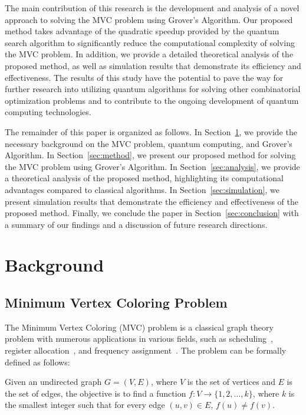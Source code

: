 The main contribution of this research is the development and analysis of a novel approach to solving the MVC problem using Grover's Algorithm. Our proposed method takes advantage of the quadratic speedup provided by the quantum search algorithm to significantly reduce the computational complexity of solving the MVC problem. In addition, we provide a detailed theoretical analysis of the proposed method, as well as simulation results that demonstrate its efficiency and effectiveness. The results of this study have the potential to pave the way for further research into utilizing quantum algorithms for solving other combinatorial optimization problems and to contribute to the ongoing development of quantum computing technologies.

The remainder of this paper is organized as follows. In Section~\ref{sec:background}, we provide the necessary background on the MVC problem, quantum computing, and Grover's Algorithm. In Section~\ref{sec:method}, we present our proposed method for solving the MVC problem using Grover's Algorithm. In Section~\ref{sec:analysis}, we provide a theoretical analysis of the proposed method, highlighting its computational advantages compared to classical algorithms. In Section~\ref{sec:simulation}, we present simulation results that demonstrate the efficiency and effectiveness of the proposed method. Finally, we conclude the paper in Section~\ref{sec:conclusion} with a summary of our findings and a discussion of future research directions.

\section{Background}
\label{sec:background}

\subsection{Minimum Vertex Coloring Problem}

The Minimum Vertex Coloring (MVC) problem is a classical graph theory problem with numerous applications in various fields, such as scheduling~\cite{malafiejski1982scheduling}, register allocation~\cite{chaitin1982register}, and frequency assignment~\cite{hale1980frequency}. The problem can be formally defined as follows:

\begin{definition}
Given an undirected graph $G = (V, E)$, where $V$ is the set of vertices and $E$ is the set of edges, the objective is to find a function $f: V \to \{1, 2, \dots, k\}$, where $k$ is the smallest integer such that for every edge $(u, v) \in E$, $f(u) \neq f(v)$.
\end{definition}

